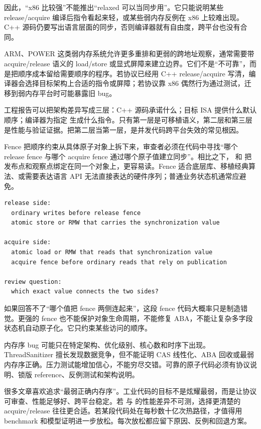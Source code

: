 因此，“x86 比较强”不能推出“relaxed 可以当同步用”。它只能说明某些 release/acquire 编译后指令看起来轻，或某些弱内存反例在 x86 上较难出现。C++ 源码仍要写出语言层面的同步，否则编译器就有自由度，跨平台也没有合同。

ARM、POWER 这类弱内存系统允许更多重排和更弱的跨地址观察，通常需要带 acquire/release 语义的 load/store 或显式屏障来建立边界。它们不是“不可靠”，而是把顺序成本留给需要顺序的程序。若协议已经用 C++ release/acquire 写清，编译器会选择目标架构上合适的指令或屏障；若协议靠 x86 偶然行为通过测试，迁移到弱内存平台时可能暴露旧 bug。

工程报告可以把架构差异写成三层：C++ 源码承诺什么；目标 ISA 提供什么默认顺序；编译器为指定  生成什么指令。只有第一层是可移植语义，第二层和第三层是性能与验证证据。把第二层当第一层，是并发代码跨平台失效的常见根因。

Fence 把顺序约束从具体原子对象上拆下来，审查者必须在代码中寻找“哪个 release fence 与哪个 acquire fence 通过哪个原子值建立同步”。相比之下， 和  把发布点和观察点绑定在同一个对象上，更容易读。Fence 适合底层库、移植经典算法、或需要表达语言 API 无法直接表达的硬件序列；普通业务状态机通常应避免。

\begin{lstlisting}[numbers=none,caption={fence 审查必须写出的三件事}]
release side:
  ordinary writes before release fence
  atomic store or RMW that carries the synchronization value

acquire side:
  atomic load or RMW that reads that synchronization value
  acquire fence before ordinary reads that rely on publication

review question:
  which exact value connects the two sides?
\end{lstlisting}

如果回答不了“哪个值把 fence 两侧连起来”，这段 fence 代码大概率只是制造错觉。更强的 fence 也不能保护对象生命周期，不能修复 ABA，不能让复杂多字段状态机自动原子化。它只约束某些访问的顺序。

内存序 bug 可能只在特定架构、优化级别、核心数和时序下出现。ThreadSanitizer 擅长发现数据竞争，但不能证明 CAS 线性化、ABA 回收或最弱内存序正确。压力测试能增加信心，不能穷尽交错。可靠的原子代码必须有协议说明、锁版 reference、反例测试和架构说明。

很多文章喜欢追求“最弱正确内存序”。工业代码的目标不是炫耀最弱，而是让协议可审查、性能足够好、跨平台稳定。若  与  的性能差异不可测，选择更清楚的 acquire/release 往往更合适。若某段代码处在每秒数十亿次热路径，才值得用 benchmark 和模型证明进一步放松。每次放松都应留下原因、反例和回退方案。

